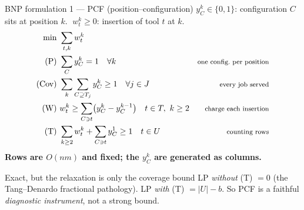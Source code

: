\documentclass[10pt]{beamer}
\newcommand{\U}{U}\newcommand{\Kst}{K^{\ast}}\newcommand{\Zst}{Z^{\ast}}
\newcommand{\cov}{\lvert\U\rvert-b}
\begin{document}
\begin{frame}{BNP formulation 1 --- PCF (position--configuration)}
$y_C^{k}\in\{0,1\}$: configuration $C$ sits at position $k$. $\;w_t^{k}\ge0$: insertion of tool $t$ at $k$.
\[
\begin{aligned}
  \min\ & \sum_{t,k} w_t^{k}\\
  \text{(P)}\ & \sum_{C} y_C^{k}=1 \quad \forall k
  &\text{\footnotesize one config.\ per position}\\
  \text{(Cov)}\ & \sum_{k}\sum_{C\supseteq T_j} y_C^{k}\ge1 \quad \forall j\in J
  &\text{\footnotesize every job served}\\
  \text{(W)}\ & w_t^{k}\ge\sum_{C\ni t}\bigl(y_C^{k}-y_C^{k-1}\bigr) \quad t\in T,\ k\ge2
  &\text{\footnotesize charge each insertion}\\
  \text{(T)}\ & \sum_{k\ge2} w_t^{k}+\sum_{C\ni t} y_C^{1}\ge1 \quad t\in\U
  &\text{\footnotesize counting rows}
\end{aligned}
\]
\textbf{Rows are $O(nm)$ and fixed; the $y_C^k$ are generated as columns.}
\begin{alertblock}{Exact, but the relaxation is only the coverage bound}
LP \emph{without} (T) $=0$ (the Tang--Denardo fractional pathology). LP \emph{with}
(T) $=\cov$. So PCF is a faithful \emph{diagnostic instrument}, not a strong bound.
\end{alertblock}
\end{frame}
\end{document}
